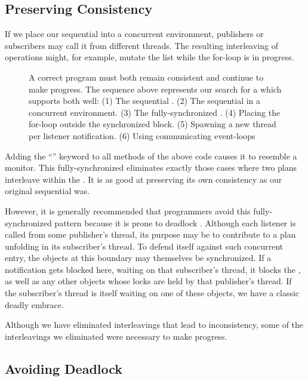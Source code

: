 \documentclass{llncs}
\begin{document}
\subsection{Preserving Consistency}

If we place our sequential  into a concurrent
environment, publishers or subscribers may call it from different
threads. The resulting interleaving of operations might, for example,
mutate the  list while the for-loop is in progress.

\begin{figure}
\centerline{}
\caption{A correct program must both remain consistent and continue to
make progress. The sequence above represents our search for a
 which supports both well:
(1) The sequential . 
(2) The sequential  in a concurrent environment.
(3) The fully-synchronized .
(4) Placing the for-loop outside the synchronized block.
(5) Spawning a new thread per listener notification.
(6) Using communicating event-loops}
\label{fig:seesaw}
\end{figure}

Adding the ``'' keyword to all methods of the above
code causes it to resemble a monitor. This fully-synchronized
 eliminates exactly those cases where two plans
interleave within the . It is as good at preserving
its own consistency as our original sequential 
was.

However, it is generally recommended that  programmers avoid
this fully-synchronized pattern because it is prone to deadlock
\cite{Englander:beans}. Although each listener is called from some
publisher's thread, its purpose may be to contribute to a plan
unfolding in its subscriber's thread. To defend itself against such
concurrent entry, the objects at this boundary may themselves be
synchronized. If a  notification gets blocked
here, waiting on that subscriber's thread, it blocks the
, as well as any other objects whose locks are held
by that publisher's thread. If the subscriber's thread is itself
waiting on one of these objects, we have a classic deadly embrace.

Although we have eliminated interleavings that lead to inconsistency,
some of the interleavings we eliminated were necessary to make
progress.

\subsection{Avoiding Deadlock}
\end{document}
